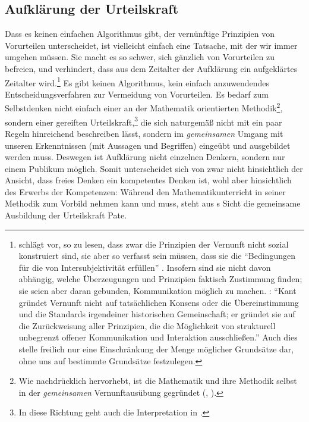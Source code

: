 \subsection{Aufklärung der
Urteilskraft}\label{subsection:AufklaerungderUrteilskraft}
Dass es keinen einfachen Algorithmus gibt, der vernünftige
Prinzipien von Vorurteilen unterscheidet, ist vielleicht einfach eine Tatsache,
mit der wir immer umgehen müssen. Sie macht es so schwer, sich gänzlich von
Vorurteilen zu befreien, und verhindert, dass aus dem Zeitalter der Aufklärung
ein aufgeklärtes Zeitalter wird.\footnote{ schlägt vor,
 so zu lesen, dass zwar die Prinzipien der Vernunft nicht
sozial konstruiert sind, sie aber so verfasst sein müssen, dass sie die
\enquote{Bedingungen für die  von Intersubjektivität
erfüllen} \parencite[][213]{ONeill:AufgeklaerteVernunft1996}. Insofern sind sie
nicht davon abhängig, welche Überzeugungen und Prinzipien faktisch Zustimmung
finden; sie seien aber daran gebunden, Kommunikation möglich zu
machen. \cite[Vgl.][219]{ONeill:AufgeklaerteVernunft1996}:
\enquote{Kant gründet Vernunft nicht auf tatsächlichen Konsens oder die
Übereinstimmung und die Standards irgendeiner historischen Gemeinschaft; er
gründet sie auf die Zurückweisung aller Prinzipien, die die Möglichkeit von
strukturell unbegrenzt offener Kommunikation und Interaktion ausschließen.}
Auch dies stelle freilich nur eine Einschränkung der Menge möglicher Grundsätze
dar, ohne uns auf bestimmte Grundsätze festzulegen.}
Es gibt keinen Algorithmus, kein einfach anzuwendendes
Entscheidungsverfahren zur Vermeidung von Vorurteilen. Es bedarf zum
Selbstdenken nicht einfach einer an der Mathematik orientierten
Methodik\footnote{Wie  nachdrücklich hervorhebt, ist die
Mathematik und ihre Methodik selbst in der \emph{gemeinsamen} Vernunftausübung
gegründet (\cite[vgl.][BA~6]{Kant:AnthropologieinpragmatischerHinsicht1977},
\cite[VII: 129.3--8]{Kant:GesammelteWerke1900ff.}).}, sondern einer gereiften
Urteilskraft,\footnote{In diese Richtung geht auch die Interpretation in
\cite{Enskat:BedingungenderAufklaerung2008}.} die sich naturgemäß nicht mit ein
paar Regeln hinreichend beschreiben lässt, sondern im \emph{gemeinsamen} Umgang
mit unseren Erkenntnissen (mit Aussagen und Begriffen) eingeübt und ausgebildet
werden muss. Deswegen ist Aufklärung nicht einzelnen Denkern, sondern nur einem
Publikum möglich. Somit unterscheidet sich  von
 zwar nicht hinsichtlich der Ansicht,
dass freies Denken ein kompetentes Denken ist, wohl aber hinsichtlich des
Erwerbs der Kompetenzen: Während  den
Mathematikunterricht in seiner Methodik zum Vorbild nehmen kann und muss, steht
aus s Sicht die gemeinsame Ausbildung der Urteilskraft
Pate.\label{Abschnitt:KantunddieOeffentlichkeitderVernunft-Ende}

